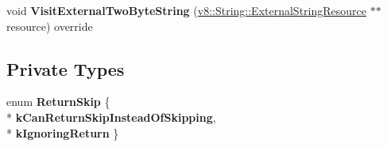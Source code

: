 \begin{DoxyCompactItemize}
\item 
void {\bfseries Visit\+External\+Two\+Byte\+String} (\hyperlink{classv8_1_1_string_1_1_external_string_resource}{v8\+::\+String\+::\+External\+String\+Resource} $\ast$$\ast$resource) override\hypertarget{classv8_1_1internal_1_1_serializer_1_1_object_serializer_a2259c206156c552551e117dedb253e6f}{}\label{classv8_1_1internal_1_1_serializer_1_1_object_serializer_a2259c206156c552551e117dedb253e6f}

\end{DoxyCompactItemize}
\subsection*{Private Types}
\begin{DoxyCompactItemize}
\item 
enum {\bfseries Return\+Skip} \{ \\*
{\bfseries k\+Can\+Return\+Skip\+Instead\+Of\+Skipping}, 
\\*
{\bfseries k\+Ignoring\+Return}
 \}\hypertarget{classv8_1_1internal_1_1_serializer_1_1_object_serializer_afce4a85da547d39d2fa29aa380868e81}{}\label{classv8_1_1internal_1_1_serializer_1_1_object_serializer_afce4a85da547d39d2fa29aa380868e81}

\end{DoxyCompactItemize}
